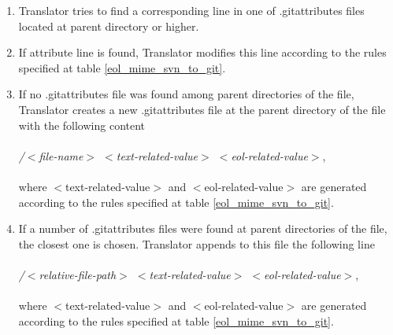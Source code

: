 \begin{enumerate}
\compactlist
\item Translator tries to find a corresponding line in one of .gitattributes files located at parent directory or higher.\\
	
\item If attribute line is found, Translator modifies this line according to the rules specified at table \ref{eol_mime_svn_to_git}.\\
	
\item If no .gitattributes file was found among parent directories of the file, Translator creates a new .gitattributes file at the parent directory of the file with the following content\\\\
\emph{/$<$file-name$>$ $<$text-related-value$>$ $<$eol-related-value$>$},\\\\
where $<$text-related-value$>$ and $<$eol-related-value$>$ are generated according to the rules specified at table \ref{eol_mime_svn_to_git}.\\
	
\item If a number of .gitattributes files were found at parent directories of the file, the closest one is chosen. Translator appends to this file the following line\\\\
\emph{/$<$relative-file-path$>$ $<$text-related-value$>$ $<$eol-related-value$>$},\\\\
where $<$text-related-value$>$ and $<$eol-related-value$>$ are generated according to the rules specified at table \ref{eol_mime_svn_to_git}.
\end{enumerate}

